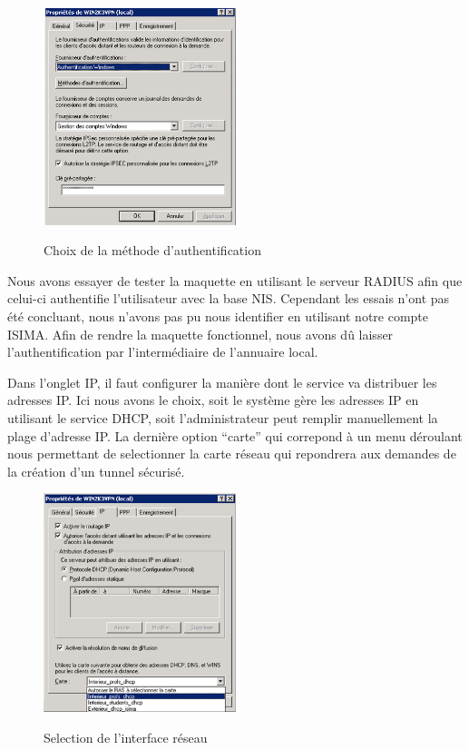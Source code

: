 \begin{figure}[H]
	\begin{center}
		\includegraphics[width=0.50\textwidth]{partie_2/screen_windows/secu_vpn.PNG}\\
	\end{center}
	\caption{Choix de la méthode d'authentification}
	\label{VPN_AUTHENTIFICATION}
\end{figure}

Nous avons essayer de tester la maquette en utilisant le serveur RADIUS afin que celui-ci authentifie l'utilisateur avec la base NIS. Cependant les essais n'ont pas été concluant, nous n'avons pas pu nous identifier en utilisant notre compte ISIMA. Afin de rendre la maquette fonctionnel, nous avons dû laisser l'authentification par l'intermédiaire de l'annuaire local.

Dans l'onglet IP, il faut configurer la manière dont le service va distribuer les adresses IP. Ici nous avons le choix, soit le système gère les adresses IP en utilisant le service DHCP, soit l'administrateur peut remplir manuellement la plage d'adresse IP. La dernière option ``carte'' qui correpond à un menu déroulant nous permettant de selectionner la carte réseau qui repondrera aux demandes de la création d'un tunnel sécurisé. 

\begin{figure}[H]
	\begin{center}
		\includegraphics[width=0.50\textwidth]{partie_2/screen_windows/choix_carte.PNG}\\
	\end{center}
	\caption{Selection de l'interface réseau}
	\label{VPN_CARTE_ECOUTE}
\end{figure}

